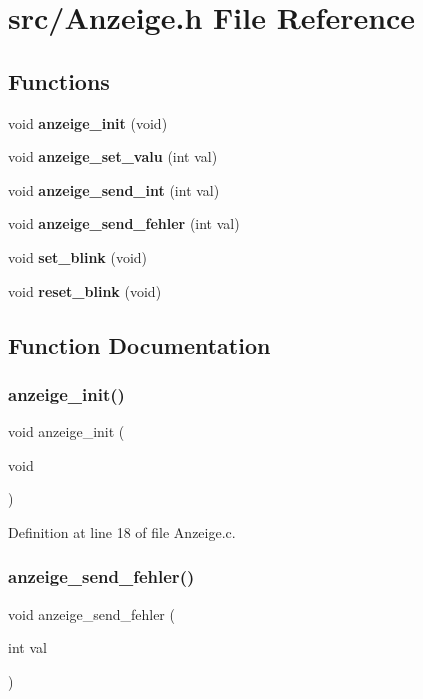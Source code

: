 \section{src/\+Anzeige.h File Reference}
\label{_anzeige_8h}
\subsection*{Functions}
\begin{DoxyCompactItemize}
\item 
void \textbf{ anzeige\+\_\+init} (void)
\item 
void \textbf{ anzeige\+\_\+set\+\_\+valu} (int val)
\item 
void \textbf{ anzeige\+\_\+send\+\_\+int} (int val)
\item 
void \textbf{ anzeige\+\_\+send\+\_\+fehler} (int val)
\item 
void \textbf{ set\+\_\+blink} (void)
\item 
void \textbf{ reset\+\_\+blink} (void)
\end{DoxyCompactItemize}


\subsection{Function Documentation}
\mbox{\label{_anzeige_8h_a3edabdf3950710d9364bc988d3002d36}} 
\subsubsection{anzeige\+\_\+init()}
{\footnotesize\ttfamily void anzeige\+\_\+init (\begin{DoxyParamCaption}\item[{void}]{ }\end{DoxyParamCaption})}



Definition at line 18 of file Anzeige.\+c.

\mbox{\label{_anzeige_8h_ad5914a6aad33abad55477d32d2235947}} 
\subsubsection{anzeige\+\_\+send\+\_\+fehler()}
{\footnotesize\ttfamily void anzeige\+\_\+send\+\_\+fehler (\begin{DoxyParamCaption}\item[{int}]{val }\end{DoxyParamCaption})}



